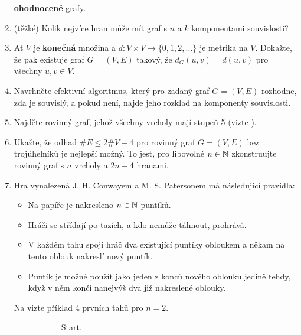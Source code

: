 \begin{enumerate}
  \textbf{ohodnocené} grafy.
 \item (těžké) Kolik nejvíce hran může mít graf s $n$ a $k$ komponentami
  souvislosti?
 \item Ať $V$ je \textbf{konečná} množina a $d:V \times V \to \{0,1,2,\ldots\}$
  je metrika na $V$. Dokažte, že pak existuje graf $G = (V,E)$ takový, že
  $d_G(u,v) = d(u,v)$ pro všechny $u,v \in V$.
 \item Navrhněte efektivní algoritmus, který pro zadaný graf $G = (V,E)$
  rozhodne, zda je souvislý, a pokud není, najde jeho rozklad na komponenty
  souvislosti.
 \item Najděte rovinný graf, jehož všechny vrcholy mají stupeň 5 (vizte
  ).
 \item Ukažte, že odhad $\# E \leq 2\# V - 4$ pro rovinný graf $G = (V,E)$ bez
  trojúhelníků je nejlepší možný. To jest, pro libovolné $n \in \mathbb{N}$ zkonstruujte
  rovinný graf s $n$ vrcholy a $2n - 4$ hranami.
 \item Hra  vynalezená J. H. Conwayem a M. S. Patersonem má následující
  pravidla:
  \begin{itemize}
   \item Na papíře je nakresleno $n \in \mathbb{N}$ puntíků.
   \item Hráči se střídají po tazích, a kdo nemůže táhnout, prohrává.
   \item V každém tahu spojí hráč dva existující puntíky obloukem a někam na
    tento oblouk nakreslí nový puntík.
   \item Puntík je možné použít jako jeden z konců nového oblouku jedině tehdy,
    když v něm končí nanejvýš dva již nakreslené oblouky.
  \end{itemize}
  Na  vizte příklad 4 prvních tahů pro
  $n = 2$.
  \begin{figure}[H]
   \centering
   \begin{subfigure}[b]{.19\textwidth}
    \centering
    \caption{Start.}
   \end{subfigure}
   \begin{subfigure}[b]{.19\textwidth}
    \centering
\end{subfigure}
\end{figure}
\end{enumerate}
